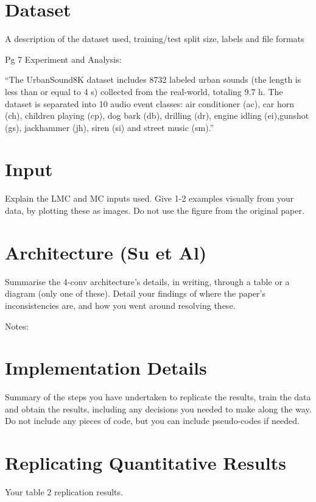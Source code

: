 \documentclass[conference]{IEEEtran}
\begin{document}
\section{Dataset}
A description of the dataset used, training/test split size, labels and file formats

Pg 7 Experiment and Analysis:

``The UrbanSound8K dataset includes 8732 labeled urban sounds (the length is less than or equal to 4 s) collected from the real-world, totaling 9.7 h. The dataset is separated into 10 audio event classes: air conditioner (ac), car horn (ch), children playing (cp), dog bark (db), drilling (dr), engine idling (ei),gunshot (gs), jackhammer (jh), siren (si) and street music (sm).''




\section{Input}
Explain the LMC and MC inputs used. Give 1-2 examples visually from your data, by plotting these as images. Do not use the figure from the original paper. 

\section{Architecture (Su et Al)}
Summarise the 4-conv architecture’s details, in writing, through a table or a diagram (only one of these). Detail your findings of where the paper’s inconsistencies are, and how you went around resolving these. 

Notes:



\section{Implementation Details}
Summary of the steps you have undertaken to replicate the results, train the data and obtain the results, including any decisions you needed to make along the way. Do not include any pieces of code, but you can include pseudo-codes if needed. 

\section{Replicating Quantitative Results}
Your table 2 replication results. 
\end{document}
